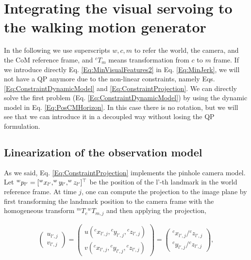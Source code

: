 \section{Integrating the visual servoing to the walking motion generator}
\label{sec:integration}
In the following we use superscripts $w,c,m$ to refer the world, the camera, and the CoM reference frame, and ${^cT_{m}}$ means transformation from $c$ to $m$ frame. If we introduce directly Eq. \ref{Eq:MinVisualFeatures2} in Eq. \ref{Eq:MinJerk}, we will not have a QP anymore due to the non-linear constraints, namely Eqs. \ref{Eq:ConstraintDynamicModel} and \ref{Eq:ConstraintProjection}. We can directly solve the first problem (Eq. \ref{Eq:ConstraintDynamicModel}) by using the dynamic model in Eq. \ref{Eq:PosCMHorizon}. In this case there is no rotation, but we will see that we can introduce it in a decoupled way without losing the QP formulation.

\subsection{Linearization of the observation model}

As we said, Eq. \ref{Eq:ConstraintProjection} implements the pinhole camera model. Let $^{w}p_{l'} = [^{w}x_{l'},^{w}y_{l'},^{w}z_{l'}]^{\top}$ be the position of the {l'}-th landmark in the world reference frame. At time $j$, one can compute the projection to the image plane by first transforming the landmark position to the camera frame with the homogeneous transform $^mT_c {^wT_{m,j}}$ and then applying the projection,

\begin{equation}
\label{Eq:Projection}
\begin{array}{c}
 \left(
 \begin{matrix}
  u_{l',j} \\
  v_{l',j}
\end{matrix}
\right)
  =
 \left(
 \begin{matrix}
  u({^cx_{l',j}},{^cy_{l',j}},{^cz_{l',j}}) \\
  v({^cx_{l',j}},{^cy_{l',j}},{^cz_{l',j}})
 \end{matrix}
 \right)
 =  \left(
 \begin{matrix}
  {^cx_{l',j}} / {^cz_{l',j}}\\
  {^cy_{l',j}} / {^cz_{l',j}}
 \end{matrix}
 \right),
 \end{array}
\end{equation}


